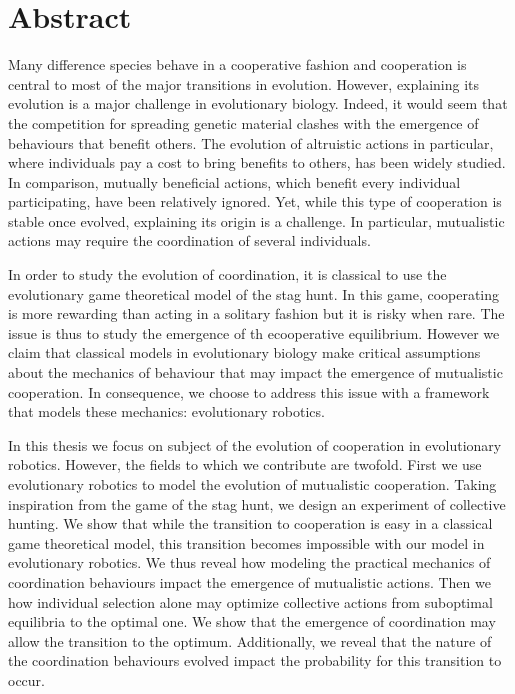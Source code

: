 \newpage
\section*{Abstract}

	Many difference species behave in a cooperative fashion and cooperation is central to most of the major transitions in evolution. However, explaining its evolution is a major challenge in evolutionary biology. Indeed, it would seem that the competition for spreading genetic material clashes with the emergence of behaviours that benefit others. The evolution of altruistic actions in particular, where individuals pay a cost to bring benefits to others, has been widely studied. In comparison, mutually beneficial actions, which benefit every individual participating, have been relatively ignored. Yet, while this type of cooperation is stable once evolved, explaining its origin is a challenge. In particular, mutualistic actions may require the coordination of several individuals.

	In order to study the evolution of coordination, it is classical to use the evolutionary game theoretical model of the stag hunt. In this game, cooperating is more rewarding than acting in a solitary fashion but it is risky when rare. The issue is thus to study the emergence of th ecooperative equilibrium. However we claim that classical models in evolutionary biology make critical assumptions about the mechanics of behaviour that may impact the emergence of mutualistic cooperation. In consequence, we choose to address this issue with a framework that models these mechanics: evolutionary robotics.

	In this thesis we focus on subject of the evolution of cooperation in evolutionary robotics. However, the fields to which we contribute are twofold. First we use evolutionary robotics to model the evolution of mutualistic cooperation. Taking inspiration from the game of the stag hunt, we design an experiment of collective hunting. We show that while the transition to cooperation is easy in a classical game theoretical model, this transition becomes impossible with our model in evolutionary robotics. We thus reveal how modeling the practical mechanics of coordination behaviours impact the emergence of mutualistic actions. Then we how individual selection alone may optimize collective actions from suboptimal equilibria to the optimal one. We show that the emergence of coordination may allow the transition to the optimum. Additionally, we reveal that the nature of the coordination behaviours evolved impact the probability for this transition to occur.


